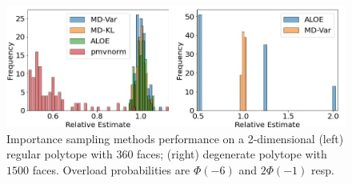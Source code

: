 \begin{figure}[t!]
    \centering
    \includegraphics[width=.95\textwidth]{Dissertation/images/sampling/histograms.jpg}
    \caption{Importance 
    sampling methods performance on a 2-dimensional (left) regular polytope with $360$ faces; (right) degenerate polytope with $1500$ faces. Overload probabilities are  $\Phi(-6)$ and $2\Phi(-1)$ resp. 
    }
    \label{fig:01}
\end{figure}




